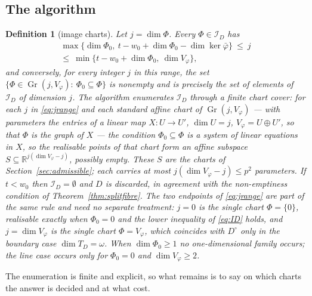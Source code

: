 \documentclass[journal]{IEEEtran}
\theoremstyle{plainn}
\newtheorem{defn}{Definition}
\theoremstyle{remark}
\newcommand{\Gr}{\operatorname{Gr}}
\begin{document}
\subsection{The algorithm}\label{sec:algorithm}

\begin{defn}[image charts]\label{defn:charts}
Let $j=\dim\Phi$. Every $\Phi\in\mathcal I_D$ has
\begin{equation}\label{eq:jrange}
\begin{gathered}
\max\bigl\{\dim\Phi_0,\ t-w_0+\dim\Phi_0-\dim\ker\bar\varphi\bigr\}\ \le\ j\\
\le\ \min\bigl\{t-w_0+\dim\Phi_0,\ \dim V_\varphi\bigr\},
\end{gathered}
\end{equation}
and conversely, for every integer $j$ in this range, the set
$\{\Phi\in\Gr(j,V_\varphi):\ \Phi_0\subseteq\Phi\}$ is nonempty and is precisely the set of elements of
$\mathcal I_D$ of dimension $j$. The algorithm enumerates $\mathcal I_D$ through a finite chart cover: for
each $j$ in \eqref{eq:jrange} and each standard affine chart of $\Gr(j,V_\varphi)$ --- with parameters the
entries of a linear map $X:U\to U'$, $\dim U=j$, $V_\varphi=U\oplus U'$, so that $\Phi$ is the graph of $X$
--- the condition $\Phi_0\subseteq\Phi$ is a system of linear equations in $X$, so the realisable points of
that chart form an affine subspace $S\subseteq\mathbb R^{j(\dim V_\varphi-j)}$, possibly empty. These $S$
are the charts of Section~\ref{sec:admissible}; each carries at most $j(\dim V_\varphi-j)\le p^2$
parameters. If $t<w_0$ then $\mathcal I_D=\emptyset$ and $D$ is discarded, in agreement with the
non-emptiness condition of Theorem~\ref{thm:splitfibre}. The two endpoints of \eqref{eq:jrange} are part of
the same rule and need no separate treatment: $j=0$ is the single chart $\Phi=\{0\}$, realisable exactly
when $\Phi_0=0$ and the lower inequality of \eqref{eq:ID} holds, and $j=\dim V_\varphi$ is the single chart
$\Phi=V_\varphi$, which coincides with $D^\circ$ only in the boundary case $\dim T_D=\omega$. When
$\dim\Phi_0\ge1$ no one-dimensional family occurs; the line case occurs only for $\Phi_0=0$ and
$\dim V_\varphi\ge2$.
\end{defn}

The enumeration is finite and explicit, so what remains is to say on which charts the answer is decided
and at what cost.
\end{document}
